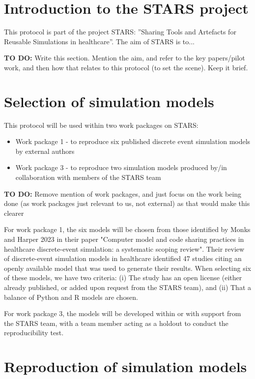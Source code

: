 \section{Introduction to the STARS project}

This protocol is part of the project STARS: ”Sharing Tools and Artefacts for Reusable Simulations in healthcare”. The aim of STARS is to...

\textbf{TO DO:} Write this section. Mention the aim, and refer to the key papers/pilot work, and then how that relates to this protocol (to set the scene). Keep it brief.

\autocite{monks_towards_2024}

\section{Selection of simulation models}

This protocol will be used within two work packages on STARS:
\begin{itemize}
    \item Work package 1 - to reproduce six published discrete event simulation models by external authors
    \item Work package 3 - to reproduce two simulation models produced by/in collaboration with members of the STARS team
\end{itemize}

\textbf{TO DO:} Remove mention of work packages, and just focus on the work being done (as work packages just relevant to us, not external) as that would make this clearer

For work package 1, the six models will be chosen from those identified by Monks and Harper 2023\autocite{monks_computer_2023} in their paper "Computer model and code sharing practices in healthcare discrete-event simulation: a systematic scoping review". Their review of discrete-event simulation models in healthcare identified 47 studies citing an openly available model that was used to generate their results. When selecting six of these models, we have two criteria: (i) The study has an open license (either already published, or added upon request from the STARS team), and (ii) That a balance of Python and R models are chosen.

For work package 3, the models will be developed within or with support from the STARS team, with a team member acting as a holdout to conduct the reproducibility test.

\section{Reproduction of simulation models}

